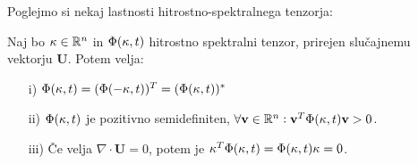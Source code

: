 \documentclass[mat2, tisk]{fmfdelo}
\newcommand{\R}{\mathbb R}
\newcommand{\bd}{\textbf}
\begin{document}
Poglejmo si nekaj lastnosti hitrostno-spektralnega tenzorja: 
\begin{trditev}
\label{hitrostno_spektralni_tenzor_lastnosti}
Naj bo $\text{\bd{$\kappa$}} \in \R^n$ in $\Phi(\text{\bd{$\kappa$}}, t)$ hitrostno spektralni 
tenzor, prirejen slučajnemu vektorju $\bd{U}$. Potem velja:
\begin{enumerate}
  \item[i)] $\Phi(\text{\bd{$\kappa$}}, t) = (\Phi(-\text{\bd{$\kappa$}}, t))^T = (\Phi(\text{\bd{$\kappa$}}, t))^*$
  \item[ii)] $\Phi(\text{\bd{$\kappa$}}, t)$ je pozitivno semidefiniten, 
  $\forall \bd{v} \in \R^n: \bd{v}^T \Phi(\text{\bd{$\kappa$}}, t) \bd{v} > 0$.
  \item[iii)] Če velja $\nabla \cdot \bd{U} = 0$, potem je 
  $\text{\bd{$\kappa$}}^T \Phi(\text{\bd{$\kappa$}}, t) = \Phi(\text{\bd{$\kappa$}}, t) \text{\bd{$\kappa$}} = 0$.
\end{enumerate}
\end{trditev}
\end{document}
